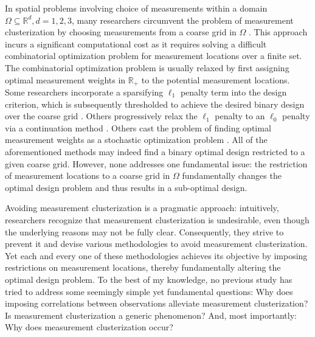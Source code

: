 In spatial problems involving choice of measurements within a domain
\(\Omega \subseteq \mathbb{R}^d, d=1,2,3\), many researchers
circumvent the problem of measurement clusterization by choosing
measurements from a coarse grid in \(\Omega\) \cite{koval2020,
  alexanderian2021, attia2022, alexanderian2014, alexanderian2016,
  alexanderian2018efficient, brunton2016}. This approach incurs a
significant computational cost as it requires solving a difficult
combinatorial optimization problem for measurement locations over a
finite set. The combinatorial optimization problem is usually relaxed
by first assigning optimal measurement weights in \(\mathbb{R}_+\) to
the potential measurement locations. Some researchers incorporate a
sparsifying \(\ell_1\) penalty term into the design criterion, which
is subsequently thresholded to achieve the desired binary design over
the coarse grid \cite{horesh2008borehole}. Others progressively relax
the \(\ell_1\) penalty to an \(\ell_0\) penalty via a continuation
method \cite{alexanderian2016, alexanderian2014}. Others cast the
problem of finding optimal measurement weights as a stochastic
optimization problem \cite{attia2022stochastic}. All of the
aforementioned methods may indeed find a binary optimal design
restricted to a given coarse grid. However, none addresses one
fundamental issue: the restriction of measurement locations to a
coarse grid in \(\Omega\) fundamentally changes the optimal design
problem and thus results in a sub-optimal design.

Avoiding measurement clusterization is a pragmatic approach:
intuitively, researchers recognize that measurement clusterization is
undesirable, even though the underlying reasons may not be fully
clear. Consequently, they strive to prevent it and devise various
methodologies to avoid measurement clusterization. Yet each and every
one of these methodologies achieves its objective by imposing
restrictions on measurement locations, thereby fundamentally altering
the optimal design problem. To the best of my knowledge, no previous
study has tried to address some seemingly simple yet fundamental
questions:
%
Why does imposing correlations between observations alleviate
measurement clusterization?
%
Is measurement clusterization a generic phenomenon? 
%
And, most importantly: Why does measurement clusterization occur?
%
%



